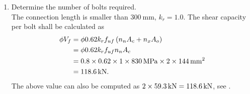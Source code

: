 \begin{solution}
\begin{enumerate}
\item Determine the number of bolts required.\\
The connection length is smaller than $\SI{300}{\mm}$, $k_r=1.0$. The shear capacity per bolt shall be calculated as
\begin{align*}
\phi{}V_f&=\phi0.62k_rf_{uf}\left(n_nA_c+n_xA_o\right)\\
&=\phi0.62k_rf_{uf}n_nA_c\\
&=0.8\times0.62\times1\times\SI{830}{\mega\pascal}\times2\times\SI{144}{\milli\meter^2}\\
&=\SI{118.6}{\kilo\newton}.
\end{align*}
The above value can also be computed as $2\times\SI{59.3}{\kilo\newton}=\SI{118.6}{\kilo\newton}$, see .


\end{enumerate}
\end{solution}
